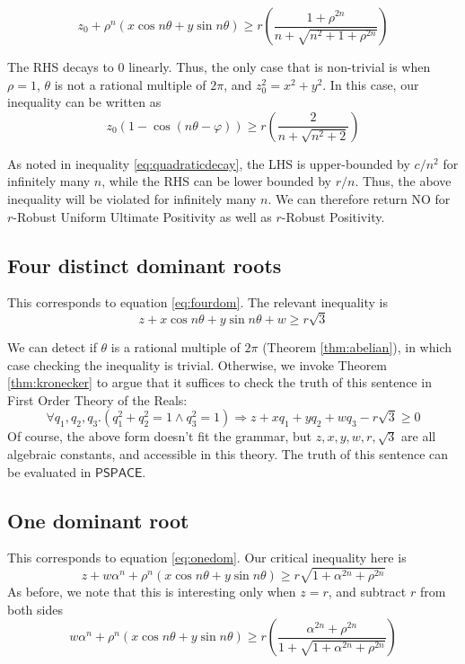 \begin{equation}
z_0 + \rho^n (x \cos n\theta + y \sin n \theta) \ge r\left( \frac{1 + \rho^{2n}}{n+ \sqrt{n^2 + 1 + \rho^{2n}}}\right)
\end{equation}

The RHS decays to $0$ linearly. Thus, the only case that is non-trivial is when $\rho = 1$, $\theta$ is not a rational multiple of $2\pi$, and $z_0^2 = x^2 + y^2$. In this case, our inequality can be written as
\begin{equation}
z_0(1 - \cos(n\theta - \varphi)) \ge r\left( \frac{2}{n+ \sqrt{n^2 + 2}}\right)
\end{equation}

As noted in inequality \ref{eq:quadraticdecay}, the LHS is upper-bounded by $c/n^2$ for infinitely many $n$, while the RHS can be lower bounded by $r/n$. Thus, the above inequality will be violated for infinitely many $n$. We can therefore return NO for $r$-Robust Uniform Ultimate Positivity as well as $r$-Robust Positivity.

\subsection{Four distinct dominant roots}
This corresponds to equation \ref{eq:fourdom}. The relevant inequality is
\begin{equation}
z + x \cos n\theta + y\sin n\theta + w \ge r\sqrt{3}
\end{equation}

We can detect if $\theta$ is a rational multiple of $2\pi$ (Theorem \ref{thm:abelian}), in which case checking the inequality is trivial. Otherwise, we invoke Theorem \ref{thm:kronecker} to argue that it suffices to check the truth of this sentence in First Order Theory of the Reals:
\begin{equation}
\forall q_1, q_2, q_3. \left(q_1^2 + q_2^2 = 1 \land q_3^2 = 1\right) \Rightarrow z + xq_1 + yq_2 + wq_3 - r\sqrt{3} \ge 0
\end{equation}
Of course, the above form doesn't fit the grammar, but $z, x, y, w, r, \sqrt{3}$ are all algebraic constants, and accessible in this theory. The truth of this sentence can be evaluated in $\mathsf{PSPACE}$.

\subsection{One dominant root}
This corresponds to equation \ref{eq:onedom}. Our critical inequality here is
\begin{equation}
z + w\alpha^n + \rho^n(x \cos n\theta + y \sin n \theta) \ge r\sqrt{1 + \alpha^{2n} + \rho^{2n}}
\end{equation}
As before, we note that this is interesting only when $z = r$, and subtract $r$ from both sides
\begin{equation}
w\alpha^n + \rho^n(x \cos n\theta + y \sin n \theta) \ge r\left(\frac{\alpha^{2n} + \rho^{2n}}{1 + \sqrt{1 + \alpha^{2n} + \rho^{2n}}}\right)
\end{equation}

